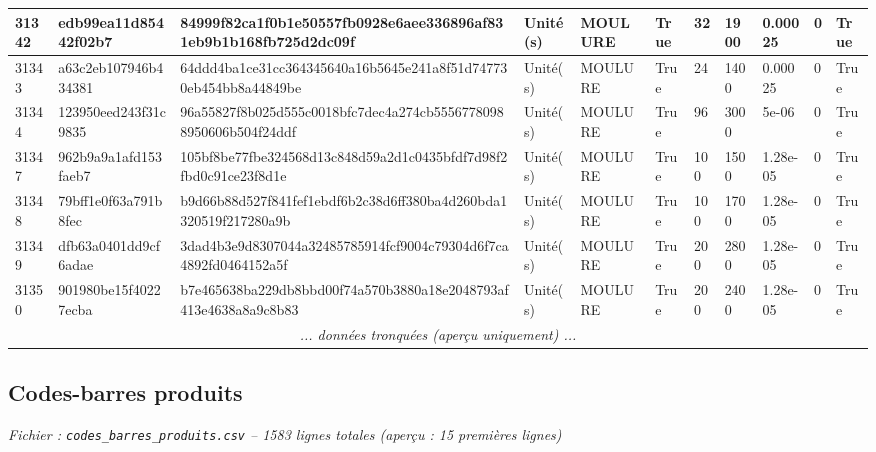 \documentclass[a4paper,11pt]{article}
\begin{document}
\begin{landscape}
\begin{longtable}{|l|l|l|l|l|l|l|l|l|l|l|}
 31342 & edb99ea11d85442f02b7 & 84999f82ca1f0b1e50557fb0928e6aee336896af831eb9b1b168fb725d2dc09f & Unité(s) & MOULURE & True & 32 & 1900 & 0.00025 & 0 & True \\ \hline
\rowcolor{rowgray} 31343 & a63c2eb107946b434381 & 64ddd4ba1ce31cc364345640a16b5645e241a8f51d747730eb454bb8a44849be & Unité(s) & MOULURE & True & 24 & 1400 & 0.00025 & 0 & True \\ \hline
 31344 & 123950eed243f31c9835 & 96a55827f8b025d555c0018bfc7dec4a274cb55567780988950606b504f24ddf & Unité(s) & MOULURE & True & 96 & 3000 & 5e-06 & 0 & True \\ \hline
\rowcolor{rowgray} 31347 & 962b9a9a1afd153faeb7 & 105bf8be77fbe324568d13c848d59a2d1c0435bfdf7d98f2fbd0c91ce23f8d1e & Unité(s) & MOULURE & True & 100 & 1500 & 1.28e-05 & 0 & True \\ \hline
 31348 & 79bff1e0f63a791b8fec & b9d66b88d527f841fef1ebdf6b2c38d6ff380ba4d260bda1320519f217280a9b & Unité(s) & MOULURE & True & 100 & 1700 & 1.28e-05 & 0 & True \\ \hline
\rowcolor{rowgray} 31349 & dfb63a0401dd9cf6adae & 3dad4b3e9d8307044a32485785914fcf9004c79304d6f7ca4892fd0464152a5f & Unité(s) & MOULURE & True & 200 & 2800 & 1.28e-05 & 0 & True \\ \hline
 31350 & 901980be15f40227ecba & b7e465638ba229db8bbd00f74a570b3880a18e2048793af413e4638a8a9c8b83 & Unité(s) & MOULURE & True & 200 & 2400 & 1.28e-05 & 0 & True \\ \hline
\multicolumn{11}{|c|}{\textit{... données tronquées (aperçu uniquement) ...}} \\ \hline
\end{longtable}
\end{landscape}
\normalsize

\newpage

\subsection{Codes-barres produits}

\textit{Fichier : \texttt{codes\_barres\_produits.csv} -- 1583 lignes totales
 (aperçu : 15 premières lignes)
}
\end{document}
